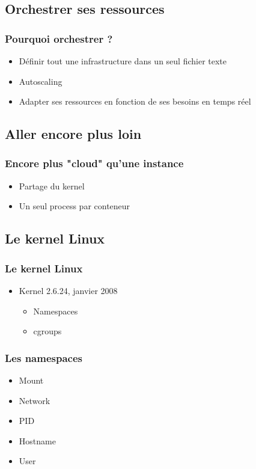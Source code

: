 \subsection[Orchestration]{Orchestrer ses ressources}

  \begin{frame}
    \frametitle{Pourquoi orchestrer ?}
    \begin{itemize}
      \item Définir tout une infrastructure dans un seul fichier texte
      \item Autoscaling
        \item Adapter ses ressources en fonction de ses besoins en temps réel
    \end{itemize}
  \end{frame}

  \subsection[Conteneurs]{Aller encore plus loin}

  \begin{frame}
    \frametitle{Encore plus "cloud" qu'une instance}
    \begin{itemize}
      \item Partage du kernel
      \item Un seul process par conteneur
    \end{itemize}
  \end{frame}

\subsection[Conteneurs]{Le kernel Linux}

  \begin{frame}
    \frametitle{Le kernel Linux}
    \begin{itemize}
      \item Kernel 2.6.24, janvier 2008
      \begin{itemize}
        \item Namespaces
        \item cgroups
      \end{itemize}
    \end{itemize}
  \end{frame}

 \begin{frame}
     \frametitle{Les namespaces}
    \begin{itemize}
      \item Mount
      \item Network
      \item PID
      \item Hostname
      \item User
    \end{itemize}
  \end{frame}


